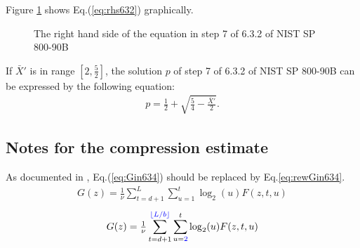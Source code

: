 ﻿\documentclass[a4paper,xelatex,english]{bxjsarticle}
\begin{document}
Figure \ref{fig:rhs632} shows Eq.(\ref{eq:rhs632}) graphically.
\begin{figure}[htbp]
\centering


\caption{The right hand side of the equation in step 7 of 6.3.2 of NIST SP 800-90B}\label{fig:rhs632}

\end{figure}

If $\bar{X}'$ is in range $[2, \tfrac{5}{2}]$, the solution $p$ of step 7 of 6.3.2 of NIST SP 800-90B\cite{SP80090B} can be expressed by the following equation:
\begin{align}
p = \frac{1}{2} + \sqrt{\frac{5}{4} - \frac{\bar{X}'}{2}}.
\end{align}

\clearpage
\subsection{Notes for the compression estimate}\label{sect:notes_compression}

As documented in \cite{CorrectionsSP80090B}, Eq.(\ref{eq:Gin634}) should be replaced by Eq.\ref{eq:rewGin634}.
\begin{align}
G(z) = \tfrac{1}{\nu} 
\sum_{t = d + 1}^{L} 
\sum_{u = 1}^{t} 
\log_{2}(u) F(z, t, u)  \label{eq:Gin634}
\end{align}
\begin{align}
G(z) = \tfrac{1}{\nu} 
\sum_{t = d + 1}^{\textcolor{blue}{\lfloor L / b \rfloor}} 
\sum_{u = \textcolor{blue}{2}}^{t} 
\log_{2}(u) F(z, t, u)  \label{eq:rewGin634}
\end{align}
\end{document}
